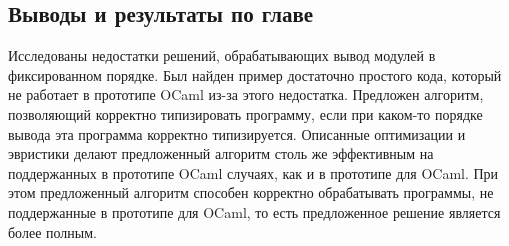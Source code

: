 \documentclass[../diploma.tex]{subfiles}
\begin{document}
\subsection{Выводы и результаты по главе}

Исследованы недостатки решений, обрабатывающих вывод модулей в фиксированном порядке. Был найден пример достаточно простого кода, который не работает в прототипе OCaml из-за этого недостатка. Предложен алгоритм, позволяющий корректно типизировать программу, если при каком-то порядке вывода эта программа корректно типизируется. Описанные оптимизации и эвристики делают предложенный алгоритм столь же эффективным на поддержанных в прототипе OCaml случаях, как и в прототипе для OCaml. При этом предложенный алгоритм способен корректно обрабатывать программы, не поддержанные в прототипе для OCaml, то есть предложенное решение является более полным.
\end{document}
